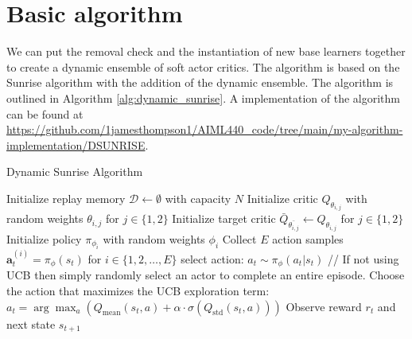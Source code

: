 \section{Basic algorithm}

We can put the removal check and the instantiation of new base learners together to create a dynamic ensemble of soft actor critics. The algorithm is based on the Sunrise algorithm \cite{leeSUNRISESimpleUnified2021} with the addition of the dynamic ensemble. The algorithm is outlined in Algorithm \ref{alg:dynamic_sunrise}. A implementation of the algorithm can be found at \url{https://github.com/1jamesthompson1/AIML440_code/tree/main/my-algorithm-implementation/DSUNRISE}.

\begin{algorithm}
\caption{Dynamic Sunrise Algorithm}
\label{alg:dynamic_sunrise}
\begin{algorithmic}[1]
\State Initialize replay memory $\mathcal{D} \leftarrow \emptyset$ with capacity $N$
    \State Initialize critic $Q_{\theta_{i,j}}$ with random weights $\theta_{i,j}$ for $j \in \{1,2\}$
    \State Initialize target critic $\bar{Q}_{\bar{\theta_{i,j}}} \leftarrow Q_{\theta_{i,j}}$ for $j \in \{1,2\}$
    \State Initialize policy $\pi_{\phi_i}$ with random weights $\phi_i$
\EndFor
\Repeat
        \State Collect $E$ action samples $\bm{a}_{t}^{(i)} = \pi_{\phi}(s_{t})$ for $i \in \{1,2,\ldots,E\}$
        \State select action: $a_{t} \sim \pi_{\phi}(a_{t} | s_{t})$
        \State // If not using UCB then simply randomly select an actor to complete an entire episode.
        \State Choose the action that maximizes the UCB exploration term:
        \State $a_{t} = \arg\max_{a} \left( Q_{\text{mean}}(s_{t}, a) + \alpha \cdot \sigma(Q_{\text{std}}(s_{t}, a)) \right)$
        \State Observe reward $r_{t}$ and next state $s_{t+1}$

\end{algorithmic}
\end{algorithm}
